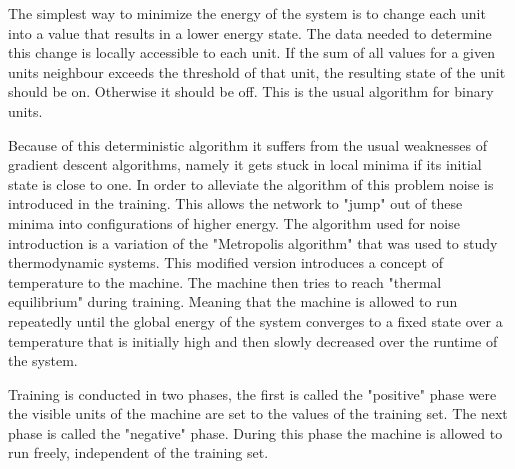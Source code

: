 \documentclass[12pt, a4paper]{article}
\begin{document}
The simplest way to minimize the energy of the system is to change each unit into a value that results in a lower energy state. The data needed to determine this change is locally accessible to each unit. If the sum of all values for a given units neighbour exceeds the threshold of that unit, the resulting state of the unit should be on. Otherwise it should be off. This is the usual algorithm for binary units.

Because of this deterministic algorithm it suffers from the usual weaknesses of gradient descent algorithms, namely it gets stuck in local minima if its initial state is close to one. In order to alleviate the algorithm of this problem noise is introduced in the training. This allows the network to "jump" out of these minima into configurations of higher energy. The algorithm used for noise introduction is a variation of the "Metropolis algorithm" \cite{metropolis1953equation} that was used to study thermodynamic systems. This modified version introduces a concept of temperature to the machine. The machine then tries to reach "thermal equilibrium" during training. Meaning that the machine is allowed to run repeatedly until the global energy of the system converges to a fixed state over a temperature that is initially high and then slowly decreased over the runtime of the system.


Training is conducted in two phases, the first is called the "positive" phase were the visible units of the machine are set to the values of the training set. The next phase is called the "negative" phase. During this phase the machine is allowed to run freely, independent of the training set.





\end{document}
